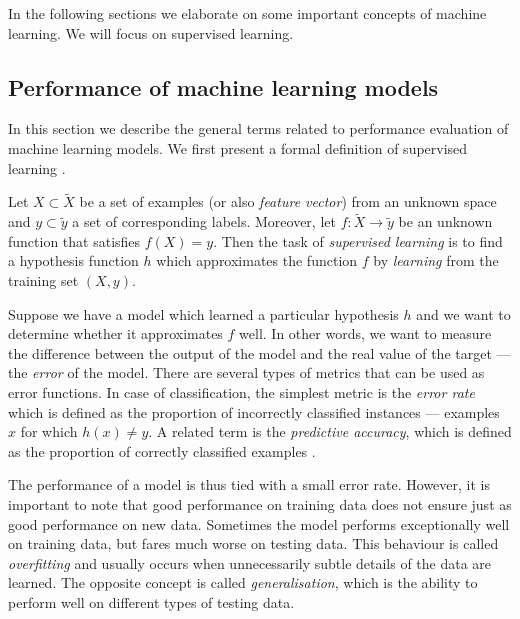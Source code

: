 In the following sections we elaborate on some important concepts of machine
learning. We will focus on supervised learning.

\subsection{Performance of machine learning models}
In this section we describe the general terms related to performance evaluation 
of machine learning models. We first present a formal 
definition of supervised learning \citep{Russell:2009:AIM:1671238,
Mitchell:1997:ML:541177}.

\begin{definition}
Let $X\subset\tilde{X}$ be a set of examples (or also \emph{feature vector})
from an unknown space and $y\subset\tilde{y}$ a set of corresponding labels.
Moreover, let $f: \tilde{X} \rightarrow \tilde{y}$ be an unknown function that
satisfies $f(X) = y$.
Then the task of \emph{supervised learning} is to find a hypothesis function
$h$ which approximates the function $f$ by \emph{learning} from the training
set $(X,y)$.

\end{definition}

Suppose we have a model which learned a particular hypothesis $h$ and we want
to determine whether it approximates $f$ well. In other words, we want to
measure the difference between the output of the model and the real value of
the target --- the \emph{error} of the model. There are several types of
metrics that can be used as error functions. In case of classification, the
simplest metric is the \emph{error rate} which is defined as the proportion of
incorrectly classified instances --- examples $x$ for which $h(x)\neq y$.
A related term is the \emph{predictive accuracy}, which is defined as the
proportion of correctly classified examples
\citep[p.~54]{Flach:2012:MLA:2490546}.

The performance of a model is thus tied with a small error rate. However, it is
important to note that good performance on training data does not ensure 
just as good performance on new data. Sometimes the model performs 
exceptionally well on training data, but fares much worse on testing data. 
This behaviour is called \emph{overfitting} and usually occurs when 
unnecessarily subtle details of the data are learned. The opposite concept 
is called \emph{generalisation}, which is the ability to perform well on 
different types of testing data.

